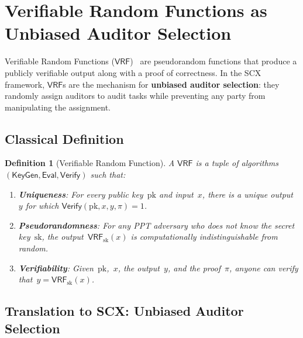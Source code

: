 \documentclass[12pt,a4paper]{article}
\newtheorem{definition}[theorem]{Definition}
\theoremstyle{remark}
\newcommand{\SCX}{\textsf{SCX}}
\newcommand{\VRF}{\textsf{VRF}}
\newcommand{\Verify}{\textsf{Verify}}
\newcommand{\KeyGen}{\textsf{KeyGen}}
\newcommand{\Eval}{\textsf{Eval}}
\begin{document}
\section{Verifiable Random Functions as Unbiased Auditor Selection}
\label{sec:vrf}

Verifiable Random Functions ($\VRF$)~\cite{micali1999verifiable} are pseudorandom functions that produce a publicly verifiable output along with a proof of correctness. In the \SCX{} framework, $\VRF$s are the mechanism for \textbf{unbiased auditor selection}: they randomly assign auditors to audit tasks while preventing any party from manipulating the assignment.

\subsection{Classical Definition}

\begin{definition}[Verifiable Random Function]
\label{def:vrf}
A $\VRF$ is a tuple of algorithms $(\KeyGen, \Eval, \Verify)$ such that:
\begin{enumerate}[leftmargin=*, label=(\roman*)]
  \item \textbf{Uniqueness}: For every public key~$\text{pk}$ and input~$x$, there is a unique output~$y$ for which $\Verify(\text{pk}, x, y, \pi) = 1$.
  \item \textbf{Pseudorandomness}: For any PPT adversary who does not know the secret key~$\text{sk}$, the output~$\VRF_{\text{sk}}(x)$ is computationally indistinguishable from random.
  \item \textbf{Verifiability}: Given~$\text{pk}$,~$x$, the output~$y$, and the proof~$\pi$, anyone can verify that~$y = \VRF_{\text{sk}}(x)$.
\end{enumerate}
\end{definition}

\subsection{Translation to SCX: Unbiased Auditor Selection}
\end{document}
